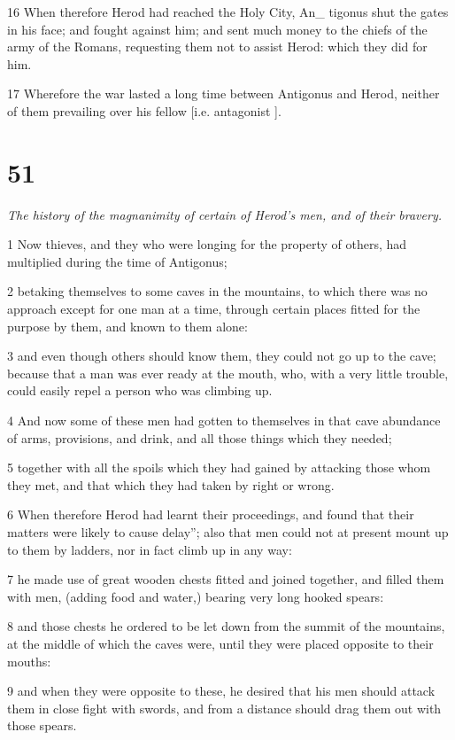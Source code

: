16 When therefore Herod had reached the Holy City, An_ tigonus shut the gates in his face; and fought against him; and sent much money to the chiefs of the army of the Romans, requesting them not to assist Herod: which they did for him. 

17 Wherefore the war lasted a long time between Antigonus and Herod, neither of them prevailing over his fellow [i.e. antagonist ]. 

\chapter{51}

\par \textit{The history of the magnanimity of certain of Herod's men, and of their bravery.}

1 Now thieves, and they who were longing for the property of others, had multiplied during the time of Antigonus; 

2 betaking themselves to some caves in the mountains, to which there was no approach except for one man at a time, through certain places fitted for the purpose by them, and known to them alone: 

3 and even though others should know them, they could not go up to the cave; because that a man was ever ready at the mouth, who, with a very little trouble, could easily repel a person who was climbing up. 

4 And now some of these men had gotten to themselves in that cave abundance of arms, provisions, and drink, and all those things which they needed; 

5 together with all the spoils which they had gained by attacking those whom they met, and that which they had taken by right or wrong. 

6 When therefore Herod had learnt their proceedings, and found that their matters were likely to cause delay”; also that men could not at present mount up to them by ladders, nor in fact climb up in any way: 

7 he made use of great wooden chests fitted and joined together, and filled them with men, (adding food and water,) bearing very long hooked spears: 

8 and those chests he ordered to be let down from the summit of the mountains, at the middle of which the caves were, until they were placed opposite to their mouths: 

9 and when they were opposite to these, he desired that his men should attack them in close fight with swords, and from a distance should drag them out with those spears. 

